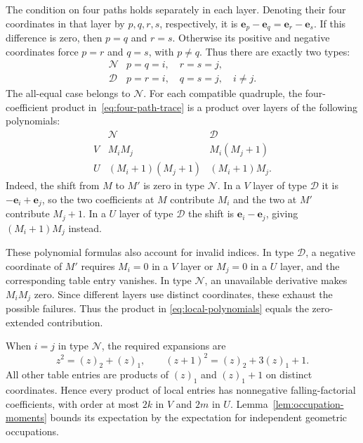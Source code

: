 The condition on four paths holds separately in each layer.  Denoting
their four coordinates in that layer by $p,q,r,s$, respectively, it is
$\mathbf e_p-\mathbf e_q=\mathbf e_r-\mathbf e_s$.  If this difference
is zero, then $p=q$ and $r=s$.  Otherwise its positive and negative
coordinates force $p=r$ and $q=s$, with $p\ne q$.  Thus there are exactly
two types:
\[
\begin{array}{c|l}
  \mathcal N & p=q=i,\quad r=s=j,\\
  \mathcal D & p=r=i,\quad q=s=j,\quad i\ne j.
\end{array}
\]
The all-equal case belongs to $\mathcal N$.  For each compatible
quadruple, the four-coefficient product in~\eqref{eq:four-path-trace}
is a product over layers of the following polynomials:
\begin{equation}
\begin{array}{c|cc}
  &\mathcal N&\mathcal D\\ \hline
  V&M_iM_j&M_i(M_j+1)\\
  U&(M_i+1)(M_j+1)&(M_i+1)M_j.
\end{array}
  \label{eq:local-polynomials}
\end{equation}
Indeed, the shift from $M$ to $M'$ is zero in type $\mathcal N$.
In a $V$ layer of type $\mathcal D$ it is $-\mathbf e_i+\mathbf e_j$,
so the two coefficients at $M$ contribute $M_i$ and the two at $M'$
contribute $M_j+1$.  In a $U$ layer of type $\mathcal D$ the shift is
$\mathbf e_i-\mathbf e_j$, giving $(M_i+1)M_j$ instead.

These polynomial formulas also account for invalid indices.  In type
$\mathcal D$, a negative coordinate of $M'$ requires $M_i=0$ in a $V$
layer or $M_j=0$ in a $U$ layer, and the corresponding table entry
vanishes.  In type $\mathcal N$, an unavailable derivative makes
$M_iM_j$ zero.  Since different layers use distinct coordinates, these
exhaust the possible failures.  Thus the product in
\eqref{eq:local-polynomials} equals the zero-extended contribution.

When $i=j$ in type $\mathcal N$, the required expansions are
\[
  z^2=(z)_2+(z)_1,
  \qquad
  (z+1)^2=(z)_2+3(z)_1+1.
\]
All other table entries are products of $(z)_1$ and $(z)_1+1$ on distinct
coordinates.  Hence every product of local entries has nonnegative
falling-factorial coefficients, with order at most $2k$ in $V$ and
$2m$ in $U$.  Lemma~\ref{lem:occupation-moments} bounds its expectation
by the expectation for independent geometric occupations.

